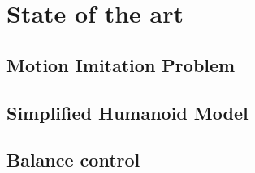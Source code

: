 \chapter{State of the art}
 
\section{Motion Imitation Problem}

\section{Simplified Humanoid Model}

\section{Balance control}
